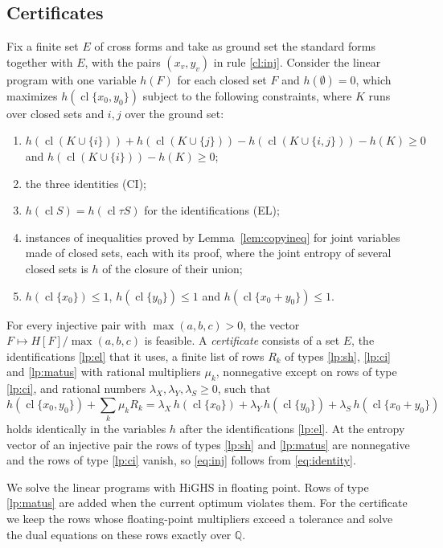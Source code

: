 \documentclass[11pt]{amsart}
\theoremstyle{definition}
\theoremstyle{remark}
\numberwithin{equation}{section}
\newcommand{\Q}{\mathbb{Q}}
\newcommand{\cl}{\operatorname{cl}}
\begin{document}
\subsection{Certificates}\label{sec:lp}
Fix a finite set $E$ of cross forms and take as ground set the standard forms together with $E$, with the pairs $(x_v,y_v)$ in rule \ref{cl:inj}. Consider the linear program with one variable $h(F)$ for each closed set $F$ and $h(\emptyset)=0$, which maximizes $h(\cl\{x_0,y_0\})$ subject to the following constraints, where $K$ runs over closed sets and $i,j$ over the ground set:
\begin{enumerate}[label=(\roman*)]
\item\label{lp:sh} $h(\cl(K\cup\{i\}))+h(\cl(K\cup\{j\}))-h(\cl(K\cup\{i,j\}))-h(K)\ge0$ and $h(\cl(K\cup\{i\}))-h(K)\ge0$;
\item\label{lp:ci} the three identities (CI);
\item\label{lp:el} $h(\cl S)=h(\cl\tau S)$ for the identifications (EL);
\item\label{lp:matus} instances of inequalities proved by Lemma~\ref{lem:copyineq} for joint variables made of closed sets, each with its proof, where the joint entropy of several closed sets is $h$ of the closure of their union;
\item\label{lp:norm} $h(\cl\{x_0\})\le1$, $h(\cl\{y_0\})\le1$ and $h(\cl\{x_0+y_0\})\le1$.
\end{enumerate}
For every injective pair with $\max(a,b,c)>0$, the vector $F\mapsto H[F]/\max(a,b,c)$ is feasible. A \emph{certificate} consists of a set $E$, the identifications \ref{lp:el} that it uses, a finite list of rows $R_k$ of types \ref{lp:sh}, \ref{lp:ci} and \ref{lp:matus} with rational multipliers $\mu_k$, nonnegative except on rows of type \ref{lp:ci}, and rational numbers $\lambda_X,\lambda_Y,\lambda_S\ge0$, such that
\begin{equation}\label{eq:identity}
h(\cl\{x_0,y_0\})+\sum_k\mu_kR_k=\lambda_X\,h(\cl\{x_0\})+\lambda_Y\,h(\cl\{y_0\})+\lambda_S\,h(\cl\{x_0+y_0\})
\end{equation}
holds identically in the variables $h$ after the identifications \ref{lp:el}. At the entropy vector of an injective pair the rows of types \ref{lp:sh} and \ref{lp:matus} are nonnegative and the rows of type \ref{lp:ci} vanish, so \eqref{eq:inj} follows from \eqref{eq:identity}.

We solve the linear programs with HiGHS \cite{HiGHS} in floating point. Rows of type \ref{lp:matus} are added when the current optimum violates them. For the certificate we keep the rows whose floating-point multipliers exceed a tolerance and solve the dual equations on these rows exactly over $\Q$.
\end{document}
